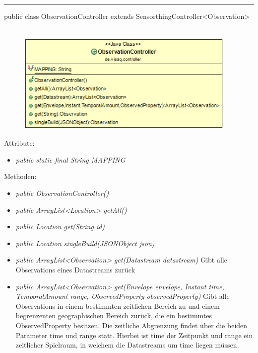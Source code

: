 \rule{\textwidth}{0.4pt}
public class ObservationController extends SensorthingController<Observation>
\\\\
\begin{minipage}{0.5\textwidth}
    \begin{figure}[H]
        {\centering\includegraphics[width=0.95\textwidth]{media/backend/controller/classes/ObservationController.png}}
    \end{figure}
    \end{minipage} \hfill
\begin{minipage}{0.5\textwidth}
\end{minipage}

Attribute:
\begin{itemize}
    \item \emph{public static final String MAPPING} \mappingDescription
\end{itemize}
Methoden:
\begin{itemize}
    \item \emph{public ObservationController()}
    \item \emph{public ArrayList<Location> getAll()}
    \extendsSensorthingController
    \item \emph{public Location get(String id)}
    \extendsSensorthingController
    \item \emph{public Location singleBuild(JSONObject json)}
    \extendsSensorthingController
    \item \emph{public ArrayList<Observation> get(Datastream datastream)}
    Gibt alle Observations eines Datastreams zurück
    \item \emph{public ArrayList<Observation> get(Envelope envelope, Instant time, TemporalAmount range, ObservedProperty observedProperty)}
    Gibt alle Observations in einem bestimmten zeitlichen Bereich zu und einem begrenzenten geographischen Bereich zurück, die ein bestimmtes ObservedProperty besitzen.
    Die zeitliche Abgrenzung findet über die beiden Parameter time und range statt. Hierbei ist time der Zeitpunkt und range ein zeitlicher Spielraum, in welchem die Datastreams um time liegen müssen.
\end{itemize}

